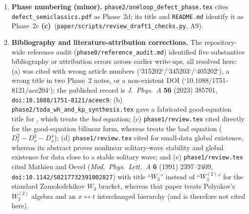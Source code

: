 \documentclass[11pt,a4paper]{article}
\newcommand{\lab}[1]{{\normalfont\sffamily\footnotesize\bfseries(#1)}}
\newcommand{\Lc}{\lab{c}}
\newcommand{\scr}[1]{\nolinkurl{#1}}
\theoremstyle{remark}
\begin{document}
\begin{enumerate}
\item \textbf{Phase numbering (minor).} \scr{phase2/oneloop_defect_phase.tex} cites \scr{defect_semiclassics.pdf} as Phase~2d; its title and \scr{README.md} identify it as Phase~2c \Lc\ (\scr{paper/scripts/review_draft1_checks.py}, A9).
\item \textbf{Bibliography and literature-attribution corrections.} The repository-wide reference audit (\scr{phase0/reference_audit.md}) identified five substantive bibliography or attribution errors across earlier write-ups, all resolved here: (a) \cite{CZ} was cited with wrong article numbers (`315202`/`345203`/`405202`), a wrong title in two Phase~2 notes, or a non-existent DOI (`10.1088/1751-8121/ace204`); the published record is \emph{J.~Phys.~A} \textbf{56} (2023) 385701, \texttt{doi:10.1088/1751-8121/aceec9}; (b) \scr{phase2/toda_wh_and_kp_synthesis.tex} gave a fabricated good-equation title for \cite{BC}, which treats the \emph{bad} equation; (c) \scr{phase1/review.tex} cited \cite{Hirota73} directly for the good-equation bilinear form, whereas \cite{Hirota73} treats the bad equation ($D_t^2-D_x^2-D_x^4$); (d) \scr{phase1/review.tex} cited \cite{BonaSachs} for small-data global existence, whereas its abstract proves nonlinear solitary-wave stability and global existence for data close to a stable solitary wave; and (e) \scr{phase1/review.tex} cited Mathieu and Oevel (\emph{Mod.\ Phys.\ Lett.\ A} \textbf{6} (1991) 2397--2409, \texttt{doi:10.1142/S0217732391002827}) with title ``$W_3$'' instead of ``$W_3^{(2)}$'' for the standard Zamolodchikov $W_3$ bracket, whereas that paper treats Polyakov's $W_3^{(2)}$ algebra and an $x\leftrightarrow t$ interchanged hierarchy (and is therefore not cited here).
\end{enumerate}
\end{document}

